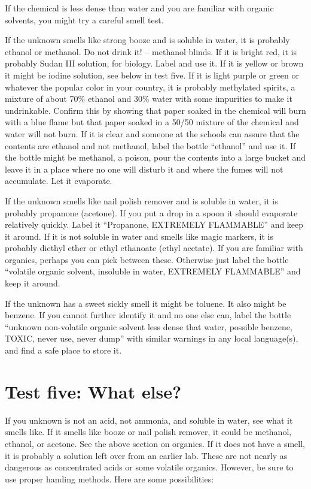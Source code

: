 If the chemical is less dense than water 
and you are familiar with organic solvents, 
you might try a careful smell test.

If the unknown smells like strong booze and is soluble in water, 
it is probably ethanol or methanol. 
Do not drink it! – methanol blinds. 
If it is bright red, 
it is probably Sudan III solution, 
for biology. 
Label and use it. 
If it is yellow or brown it might be iodine solution, 
see below in test five. 
If it is light purple or green or whatever 
the popular color in your country, 
it is probably methylated spirits, 
a mixture of about 70\% ethanol and 30\% water
with some impurities to make it undrinkable. 
Confirm this by showing that paper soaked in the chemical 
will burn with a blue flame but that paper soaked in a 50/50 
mixture of the chemical and water will not burn. 
If it is clear and someone at the schools can assure 
that the contents are ethanol and not methanol, 
label the bottle “ethanol” and use it. 
If the bottle might be methanol, 
a poison, 
pour the contents into a large bucket 
and leave it in a place where no one will disturb it 
and where the fumes will not accumulate. 
Let it evaporate.

If the unknown smells like nail polish remover 
and is soluble in water, 
it is probably propanone (acetone). 
If you put a drop in a spoon it should evaporate relatively quickly. 
Label it “Propanone, 
EXTREMELY FLAMMABLE” and keep it around. 
If it is not soluble in water and smells like magic markers, 
it is probably diethyl ether or ethyl ethanoate (ethyl acetate). 
If you are familiar with organics, 
perhaps you can pick between these. 
Otherwise just label the bottle “volatile organic solvent, 
insoluble in water, 
EXTREMELY FLAMMABLE” and keep it around.

If the unknown has a sweet sickly smell it might be toluene. 
It also might be benzene. 
If you cannot further identify it and no one else can, 
label the bottle “unknown non-volatile organic solvent 
less dense that water, 
possible benzene, 
TOXIC, 
never use, 
never dump” with similar warnings in any local language(s), 
and find a safe place to store it.

\section{Test five: What else?}

If you unknown is not an acid, 
not ammonia, 
and soluble in water, 
see what it smells like. 
If it smells like booze or nail polish remover, 
it could be methanol, 
ethanol, 
or acetone. 
See the above section on organics. 
If it does not have a smell, 
it is probably a solution left over from an earlier lab. 
These are not nearly as dangerous as concentrated acids 
or some volatile organics. 
However, 
be sure to use proper handing methods. 
Here are some possibilities:

